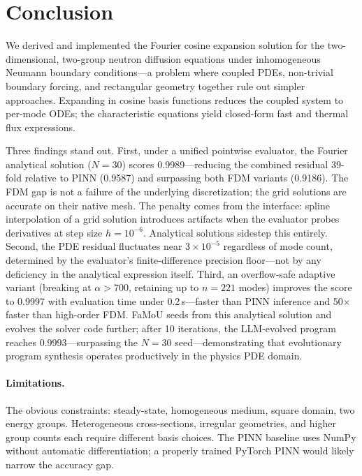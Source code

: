 \section{Conclusion}
\label{sec:conclusion}

We derived and implemented the Fourier cosine expansion solution for the two-dimensional, two-group neutron diffusion equations under inhomogeneous Neumann boundary conditions---a problem where coupled PDEs, non-trivial boundary forcing, and rectangular geometry together rule out simpler approaches.
Expanding in cosine basis functions reduces the coupled system to per-mode ODEs; the characteristic equations yield closed-form fast and thermal flux expressions.

Three findings stand out.
First, under a unified pointwise evaluator, the Fourier analytical solution ($N{=}30$) scores 0.9989---reducing the combined residual 39-fold relative to PINN (0.9587) and surpassing both FDM variants (0.9186).
The FDM gap is not a failure of the underlying discretization; the grid solutions are accurate on their native mesh.
The penalty comes from the interface: spline interpolation of a grid solution introduces artifacts when the evaluator probes derivatives at step size $h = 10^{-6}$.
Analytical solutions sidestep this entirely.
Second, the PDE residual fluctuates near $3 \times 10^{-5}$ regardless of mode count, determined by the evaluator's finite-difference precision floor---not by any deficiency in the analytical expression itself.
Third, an overflow-safe adaptive variant (breaking at $\alpha > 700$, retaining up to $n{=}221$ modes) improves the score to 0.9997 with evaluation time under 0.2\,s---faster than PINN inference and 50$\times$ faster than high-order FDM.
FaMoU seeds from this analytical solution and evolves the solver code further; after 10 iterations, the LLM-evolved program reaches 0.9993---surpassing the $N{=}30$ seed---demonstrating that evolutionary program synthesis operates productively in the physics PDE domain.

\paragraph{Limitations.}
The obvious constraints: steady-state, homogeneous medium, square domain, two energy groups.
Heterogeneous cross-sections, irregular geometries, and higher group counts each require different basis choices.
The PINN baseline uses NumPy without automatic differentiation; a properly trained PyTorch PINN would likely narrow the accuracy gap.

